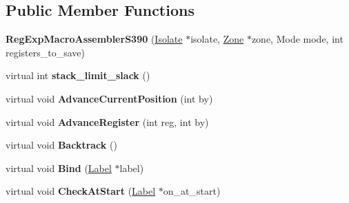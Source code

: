 \subsection*{Public Member Functions}
\begin{DoxyCompactItemize}
\item 
{\bfseries Reg\+Exp\+Macro\+Assembler\+S390} (\hyperlink{classv8_1_1internal_1_1_isolate}{Isolate} $\ast$isolate, \hyperlink{classv8_1_1internal_1_1_zone}{Zone} $\ast$zone, Mode mode, int registers\+\_\+to\+\_\+save)\hypertarget{classv8_1_1internal_1_1_reg_exp_macro_assembler_s390_af615e0b83e5b78405b32ee008cad2415}{}\label{classv8_1_1internal_1_1_reg_exp_macro_assembler_s390_af615e0b83e5b78405b32ee008cad2415}

\item 
virtual int {\bfseries stack\+\_\+limit\+\_\+slack} ()\hypertarget{classv8_1_1internal_1_1_reg_exp_macro_assembler_s390_aeb35006f7cc46af3df70ada2416af928}{}\label{classv8_1_1internal_1_1_reg_exp_macro_assembler_s390_aeb35006f7cc46af3df70ada2416af928}

\item 
virtual void {\bfseries Advance\+Current\+Position} (int by)\hypertarget{classv8_1_1internal_1_1_reg_exp_macro_assembler_s390_af6781152d4c094ec11c41077f1117cfb}{}\label{classv8_1_1internal_1_1_reg_exp_macro_assembler_s390_af6781152d4c094ec11c41077f1117cfb}

\item 
virtual void {\bfseries Advance\+Register} (int reg, int by)\hypertarget{classv8_1_1internal_1_1_reg_exp_macro_assembler_s390_a0f23b509690105372c0745d204ba632a}{}\label{classv8_1_1internal_1_1_reg_exp_macro_assembler_s390_a0f23b509690105372c0745d204ba632a}

\item 
virtual void {\bfseries Backtrack} ()\hypertarget{classv8_1_1internal_1_1_reg_exp_macro_assembler_s390_a3c8255e5c9f024b9462b9289d42172df}{}\label{classv8_1_1internal_1_1_reg_exp_macro_assembler_s390_a3c8255e5c9f024b9462b9289d42172df}

\item 
virtual void {\bfseries Bind} (\hyperlink{classv8_1_1internal_1_1_label}{Label} $\ast$label)\hypertarget{classv8_1_1internal_1_1_reg_exp_macro_assembler_s390_a2283afa39cdf68351985857eac0f0d5f}{}\label{classv8_1_1internal_1_1_reg_exp_macro_assembler_s390_a2283afa39cdf68351985857eac0f0d5f}

\item 
virtual void {\bfseries Check\+At\+Start} (\hyperlink{classv8_1_1internal_1_1_label}{Label} $\ast$on\+\_\+at\+\_\+start)\hypertarget{classv8_1_1internal_1_1_reg_exp_macro_assembler_s390_aaa8a2096c560dce42ed31c9291a5e92b}{}\label{classv8_1_1internal_1_1_reg_exp_macro_assembler_s390_aaa8a2096c560dce42ed31c9291a5e92b}


\end{DoxyCompactItemize}
